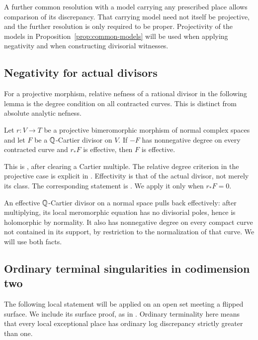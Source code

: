 A further common resolution with a model carrying any prescribed
place allows comparison of its discrepancy. That carrying model
need not itself be projective, and the further resolution is only
required to be proper. Projectivity of the models in
Proposition~\ref{prop:common-models} will be used when applying
negativity and when constructing divisorial witnesses.

\subsection{Negativity for actual divisors}

For a projective morphism, relative nefness of a rational divisor
in the following lemma is the degree condition on all contracted
curves. This is distinct from absolute analytic nefness.

\begin{lemma}\label{lem:negativity}
Let $r:V\to T$ be a projective bimeromorphic morphism of normal
complex spaces and let $F$ be a $\mathbb Q$-Cartier divisor on $V$.
If $-F$ has nonnegative degree on every contracted curve and
$r_*F$ is effective, then $F$ is effective.
\end{lemma}

This is \cite[Lemma~1.3 and Appendix~A]{Wang2021}, after
clearing a Cartier multiple. The relative degree criterion in
the projective case is explicit in \cite[Appendix~B]{Wang2021}.
Effectivity is that of the actual divisor, not merely its class.
The corresponding statement is
\cite[Lemma~2.3(i)]{OrdinaryKahler}. We apply it only when $r_*F=0$.

An effective $\mathbb Q$-Cartier divisor on a normal space pulls back
effectively: after multiplying, its local meromorphic equation
has no divisorial poles, hence is holomorphic by normality.
It also has nonnegative degree on every compact curve not
contained in its support, by restriction to the normalization
of that curve. We will use both facts.

\subsection{Ordinary terminal singularities in codimension two}

The following local statement will be applied on an open set
meeting a flipped surface. We include its surface proof, as in
\cite[Lemma~4.4]{OrdinaryKahler}. Ordinary terminality here means
that every local exceptional place has ordinary log discrepancy
strictly greater than one.

